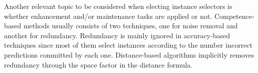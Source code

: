 \documentclass[preprint,12pt]{elsarticle}
\begin{document}
\begin{itemize}
Another relevant topic to be considered when electing instance selectors is whether enhancement and/or maintenance tasks are applied or not. Competence-based methods usually consists of two techniques, one for noise removal and another for redundancy. Redundancy is mainly ignored in accuracy-based techniques since most of them select instances according to the number incorrect predictions committed by each one. Distance-based algorithms implicitly removes redundancy through the space factor in the distance formula.

%
%
%

\end{itemize}
\end{document}
